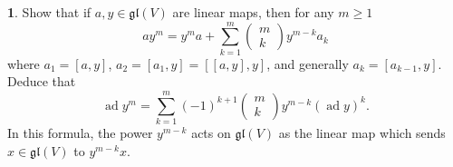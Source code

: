 \documentclass[12pt]{article}
\DeclareMathOperator{\ad}{ad}
\DeclareMathOperator{\tr}{tr}
\newcommand{\gl}{\mathfrak{gl}}
\theoremstyle{definition}
\newtheorem{ex}{}
\begin{document}
\begin{ex}
  Show that if $a, y \in \gl(V)$ are linear maps, then for any $m \geq 1$ \begin{equation*}
    ay^m = y^m a + \sum_{k=1}^m \begin{pmatrix}m \\ k\end{pmatrix} y^{m-k}a_k
  \end{equation*}
  where $a_1 = [a,y]$, $a_2 = [a_1, y] = [[a,y],y]$, and generally $a_k = [a_{k-1},y]$.
  Deduce that \begin{equation*}
    \ad y^m = \sum_{k=1}^m (-1)^{k+1}\begin{pmatrix}m \\ k\end{pmatrix}y^{m-k}(\ad y)^k.
  \end{equation*}
  In this formula, the power $y^{m-k}$ acts on $\gl(V)$ as the linear map which sends $x \in \gl(V)$ to $y^{m-k}x$.
\end{ex}

\end{document}
